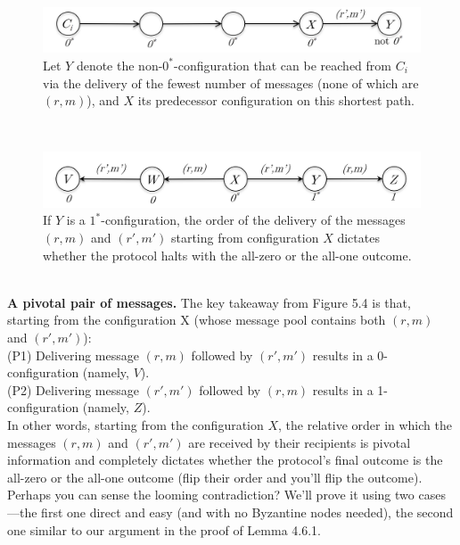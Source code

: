 \begin{figure}[h]
    \centering
    \includegraphics[scale = 0.5]{figures/f18.png}
    \caption{Let $Y$ denote the non-$0^*$-configuration that can be reached from $C_i$ via the delivery of the fewest number of messages (none of which are $(r, m)$), and $X$ its predecessor
configuration on this shortest path.}
    \label{fig:mesh1}
\end{figure}\\
\begin{figure}[h]
    \centering
    \includegraphics[scale = 0.5]{figures/f19.png}
    \caption{ If $Y$ is a $1^*$-configuration, the order of the delivery of the messages $(r, m)$
and $(r', m')$ starting from configuration $X$ dictates whether the protocol halts with the
all-zero or the all-one outcome.}
    \label{fig:mesh1}
\end{figure}\\

\noindent
\textbf{A pivotal pair of messages.} The key takeaway from Figure 5.4 is that, starting from the
configuration X (whose message pool contains both $(r, m)$ and $(r', m')$):\\
\noindent
(P1) Delivering message $(r, m)$ followed by $(r', m')$ results in a 0-configuration (namely, $V$).\\
\noindent
(P2) Delivering message $(r', m')$ followed by $(r, m)$ results in a 1-configuration (namely, $Z$).\\

In other words, starting from the configuration $X$, the relative order in which the messages $(r, m)$ and $(r', m')$ are received by their recipients is pivotal information and completely
dictates whether the protocol’s final outcome is the all-zero or the all-one outcome (flip their
order and you’ll flip the outcome). Perhaps you can sense the looming contradiction? We’ll
prove it using two cases—the first one direct and easy (and with no Byzantine nodes needed),
the second one similar to our argument in the proof of Lemma 4.6.1.\\

